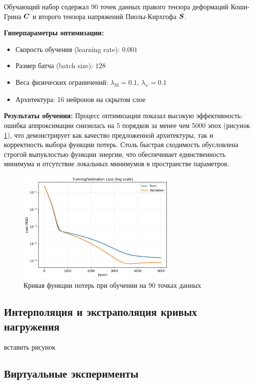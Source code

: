 Обучающий набор содержал 90 точек данных правого тензора деформаций Коши-Грина $\boldsymbol{C}$ 
и второго тензора напряжений Пиолы-Кирхгофа $\boldsymbol{S}$.

\textbf{Гиперпараметры оптимизации:}
\begin{itemize}
  \item Скорость обучения (learning rate): $0.001$
  \item Размер батча (batch size): $128$
  \item Веса физических ограничений: $\lambda_{\text{SI}} = 0.1$, $\lambda_{\psi} = 0.1$
  \item Архитектура: 16 нейронов на скрытом слое
\end{itemize}

\textbf{Результаты обучения:}
Процесс оптимизации показал высокую эффективность: ошибка аппроксимации снизилась на 5 порядков за менее чем 5000 эпох (рисунок \ref{fig:loss_curve}), 
что демонстрирует как качество предложенной архитектуры, так и корректность выбора функции потерь. 
Столь быстрая сходимость обусловлена строгой выпуклостью функции энергии, что обеспечивает единственность 
минимума и отсутствие локальных минимумов в пространстве параметров.

\begin{figure}[H]
  \centering
  \includegraphics[width=0.7\textwidth]{img/loss_curve.png}
  \caption{Кривая функции потерь при обучении на 90 точках данных}
  \label{fig:loss_curve}
\end{figure}


\subsection{Интерполяция и экстраполяция кривых нагружения}
  вставить рисунок

\subsection{Виртуальные эксперименты}

